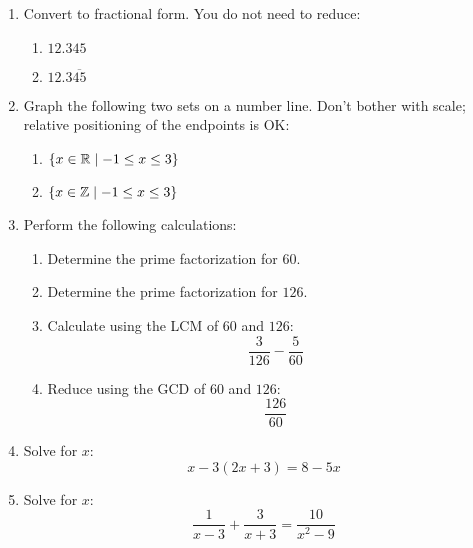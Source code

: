 \documentclass[letterpaper,12pt,fleqn]{article}
\begin{document}
\begin{enumerate}
  \bigskip

\item Convert to fractional form. You do not need to reduce:
  \begin{enumerate}
  \item $12.345$

    \vspace{1in}
    
  \item $12.3\overline{45}$

  \end{enumerate}

  \newpage

\item Graph the following two sets on a number line. Don't bother with scale;
  relative positioning of the endpoints is OK:
  \begin{enumerate}
  \item $\{x\in\mathbb{R}\mid -1\le x\le 3\}$

    \vspace{2in}
    
  \item $\{x\in\mathbb{Z}\mid -1\le x\le 3\}$

  \end{enumerate}

  \newpage

\item Perform the following calculations:
  \begin{enumerate}
  \item Determine the prime factorization for $60$.

    \vspace{1in}
    
  \item Determine the prime factorization for $126$.

    \vspace{1in}
    
  \item Calculate using the LCM of $60$ and $126$:
    \[\frac{3}{126}-\frac{5}{60}\]

    \vspace{2in}
    
  \item Reduce using the GCD of $60$ and $126$:
    \[\frac{126}{60}\]
  \end{enumerate}

  \newpage

\item Solve for $x$:
  \[x-3(2x+3)=8-5x\]

  \vspace{3in}

\item Solve for $x$:
  \[\frac{1}{x-3}+\frac{3}{x+3}=\frac{10}{x^2-9}\]

\end{enumerate}
\end{document}
